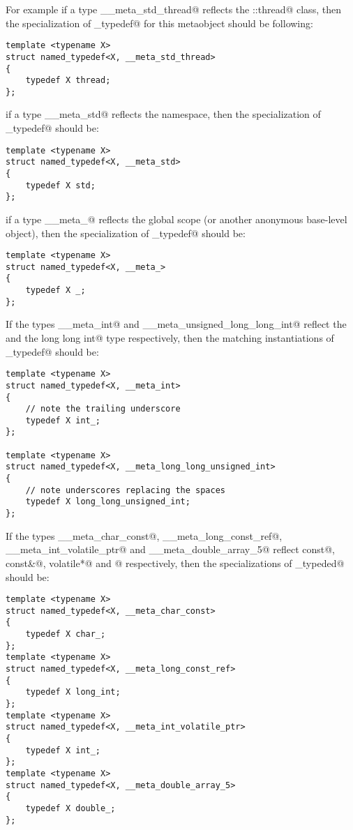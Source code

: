 For example if a type \verb@__meta_std_thread@
reflects the \verb@std::thread@ class, then the specialization of \verb@named_typedef@
for this metaobject should be following:

\begin{verbatim}
template <typename X>
struct named_typedef<X, __meta_std_thread>
{
	typedef X thread;
};
\end{verbatim}

if a type \verb@__meta_std@ reflects the \verb@std@ namespace, then the specialization of \verb@named_typedef@
should be:

\begin{verbatim}
template <typename X>
struct named_typedef<X, __meta_std>
{
	typedef X std;
};
\end{verbatim}

if a type \verb@__meta_@ reflects the global scope (or another anonymous base-level object),
then the specialization of \verb@named_typedef@ should be:

\begin{verbatim}
template <typename X>
struct named_typedef<X, __meta_>
{
	typedef X _;
};
\end{verbatim}

If the types \verb@__meta_int@ and \verb@__meta_unsigned_long_long_int@ reflect the \verb@int@ and
the \verb@unsigned long long int@ type
respectively, then the matching instantiations of \verb@named_typedef@ should be:

\begin{verbatim}
template <typename X>
struct named_typedef<X, __meta_int>
{
	// note the trailing underscore
	typedef X int_;
};

template <typename X>
struct named_typedef<X, __meta_long_long_unsigned_int>
{
	// note underscores replacing the spaces
	typedef X long_long_unsigned_int;
};
\end{verbatim}

If the types \verb@__meta_char_const@, \verb@__meta_long_const_ref@, \verb@__meta_int_volatile_ptr@ and \verb@__meta_double_array_5@
reflect \verb@char const@, \verb@long const&@, \verb@int volatile*@ and \verb@double[5]@ respectively,
then the specializations of \verb@named_typeded@ should be:

\begin{verbatim}
template <typename X>
struct named_typedef<X, __meta_char_const>
{
	typedef X char_;
};
template <typename X>
struct named_typedef<X, __meta_long_const_ref>
{
	typedef X long_int;
};
template <typename X>
struct named_typedef<X, __meta_int_volatile_ptr>
{
	typedef X int_;
};
template <typename X>
struct named_typedef<X, __meta_double_array_5>
{
	typedef X double_;
};
\end{verbatim}


